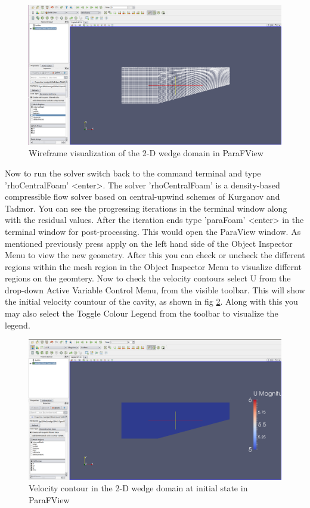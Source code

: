 \documentclass[a4paper,12pt]{report}
\begin{document}
\begin{figure}[ht]  
\begin{center}  
\includegraphics[scale=0.24]{para2.png}
\caption{Wireframe visualization of the 2-D wedge domain in ParaFView}
\label{para2}
\end{center}  
\end{figure}

\flushleft Now to run the solver switch back to the command terminal and type 'rhoCentralFoam' <enter>. The solver 'rhoCentralFoam' is a density-based compressible flow solver based on central-upwind schemes of Kurganov and Tadmor. You can see the progressing iterations in the terminal window along with the residual values. After the iteration ends type 'paraFoam' <enter> in the terminal window for post-processing.  
\flushleft This would open the ParaView window. As mentioned previously press apply on the left hand side of the Object Inspector Menu to view the new geometry. After this you can check or uncheck the different regions within the mesh region in  the Object Inspector Menu to visualize differnt regions on the geomtery. Now to check the velocity contours select U from the drop-down Active Variable Control Menu, from the visible toolbar. This will show the initial velocity countour of the cavity, as shown in fig \ref{velini}. Along with this you may also select the Toggle Colour Legend from the toolbar to visualize the legend. 

\begin{figure}[ht]  
\begin{center}  
\includegraphics[scale=0.24]{velini.png}
\caption{Velocity contour in the 2-D wedge domain at initial state in ParaFView}
\label{velini}
\end{center}  
\end{figure}
\end{document}
